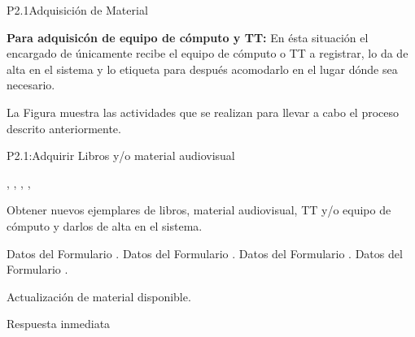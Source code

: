 \begin{Proceso}{P2.1}{Adquisición de Material}
{\textbf{Para adquisicón de equipo de cómputo y TT:} En ésta situación el encargado de  únicamente recibe el equipo de cómputo o TT a registrar, lo da de alta en el sistema y lo etiqueta para después acomodarlo en el lugar dónde sea necesario.

  
  \newpage
  \noindent La Figura  muestra las actividades que se realizan para llevar a cabo el proceso descrito anteriormente.


} {P2.1:Adquirir Libros y/o material audiovisual}

   { %
	,
	 ,
	,
	,
  }

   { %
    Obtener nuevos ejemplares de libros, material audiovisual, TT y/o equipo de cómputo y darlos de alta en el sistema.
  }

   { %
  	\begin{UClist}
  		\UCli Datos del Formulario . 
  		\UCli Datos del Formulario .
		\UCli Datos del Formulario .
		\UCli Datos del Formulario . 
     	
    \end {UClist}
  }
  
   { %
  }

   { %
    \begin{UClist}
		\UCli	Actualización de material disponible.
    \end{UClist}
  }

   { %
  }

   { %
    \begin{UClist}
      \UCli Respuesta inmediata
    \end{UClist}
  }
   { %
  }


\end{Proceso}
